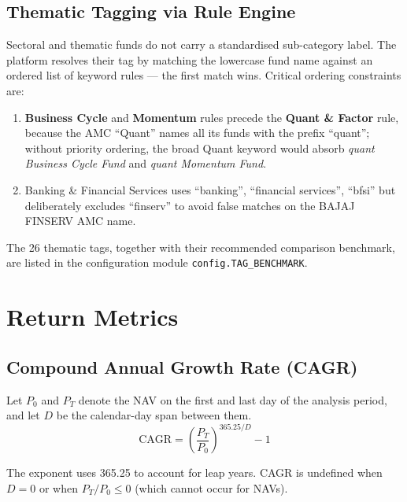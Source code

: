 \documentclass[12pt, a4paper]{article}
\newcommand{\CAGR}{\mathrm{CAGR}}
\begin{document}
\subsection{Thematic Tagging via Rule Engine}

Sectoral and thematic funds do not carry a standardised sub-category
label.  The platform resolves their tag by matching the lowercase fund
name against an ordered list of keyword rules — the first match wins.
Critical ordering constraints are:

\begin{enumerate}[label=\arabic*.]
  \item \textbf{Business Cycle} and \textbf{Momentum} rules precede the
    \textbf{Quant \& Factor} rule, because the AMC ``Quant'' names all
    its funds with the prefix ``quant''; without priority ordering, the
    broad Quant keyword would absorb \emph{quant Business Cycle Fund} and
    \emph{quant Momentum Fund}.
  \item Banking \& Financial Services uses ``banking'', ``financial
    services'', ``bfsi'' but deliberately excludes ``finserv'' to avoid
    false matches on the BAJAJ FINSERV AMC name.
\end{enumerate}

The 26 thematic tags, together with their recommended comparison benchmark,
are listed in the configuration module \texttt{config.TAG\_BENCHMARK}.

\section{Return Metrics}

\subsection{Compound Annual Growth Rate (CAGR)}

\begin{definition}[CAGR]
Let $P_0$ and $P_T$ denote the NAV on the first and last day of the
analysis period, and let $D$ be the calendar-day span between them.
\[
  \CAGR = \left(\frac{P_T}{P_0}\right)^{365.25 / D} - 1
\]
\end{definition}

The exponent uses 365.25 to account for leap years.  CAGR is undefined
when $D = 0$ or when $P_T / P_0 \leq 0$ (which cannot occur for NAVs).
\end{document}
